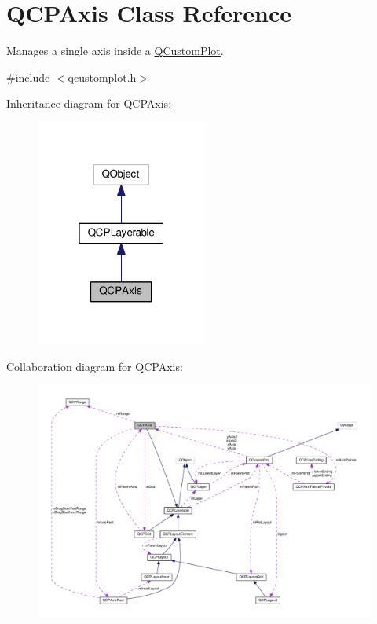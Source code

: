 \hypertarget{classQCPAxis}{}\section{Q\+C\+P\+Axis Class Reference}
\label{classQCPAxis}


Manages a single axis inside a \hyperlink{classQCustomPlot}{Q\+Custom\+Plot}.  




{\ttfamily \#include $<$qcustomplot.\+h$>$}



Inheritance diagram for Q\+C\+P\+Axis\+:
\nopagebreak
\begin{figure}[H]
\begin{center}
\leavevmode
\includegraphics[width=160pt]{classQCPAxis__inherit__graph}
\end{center}
\end{figure}


Collaboration diagram for Q\+C\+P\+Axis\+:
\nopagebreak
\begin{figure}[H]
\begin{center}
\leavevmode
\includegraphics[width=350pt]{classQCPAxis__coll__graph}
\end{center}
\end{figure}

